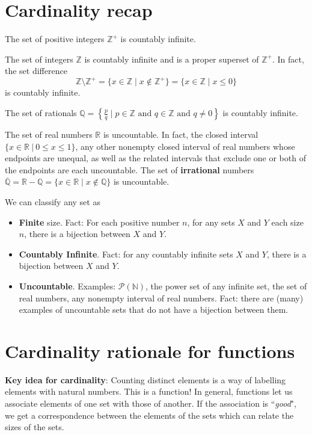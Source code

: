 \documentclass[12pt, oneside]{article}
\begin{document}
\section*{Cardinality recap}



The set of positive integers $\mathbb{Z}^{+}$ is countably infinite.

The set of integers $\mathbb{Z}$ is countably infinite and is a proper superset of $\mathbb{Z}^{+}$. 
In fact, the set difference 
$$\mathbb{Z} \setminus \mathbb{Z}^{+} = \{ x \in \mathbb{Z} \mid x \notin \mathbb{Z}^+\} 
= \{ x \in \mathbb{Z} \mid x \leq 0 \}$$ is countably infinite.

The set of rationals 
$\mathbb{Q} = \left\{ \frac{p}{q} \mid p \in \mathbb{Z}  \text{ and  } 
q  \in \mathbb{Z} \text{ and } q \neq  0 \right\}$ is countably infinite.


The set of real numbers $\mathbb{R}$ is uncountable. In fact, the closed 
interval $\{x \in \mathbb{R} ~|~ 0 \leq x \leq 1\}$, 
any other nonempty closed interval of real numbers whose endpoints are 
unequal, as well as the related intervals that exclude one or both of the endpoints are
each uncountable.
The set of {\bf irrational} numbers $\overline{\mathbb{Q}} = \mathbb{R} - \mathbb{Q}
= \{ x \in \mathbb{R} \mid x \notin \mathbb{Q} \}$ is uncountable.

\vfill

We can classify any set as 
\begin{itemize}
\item {\bf Finite} size. Fact: For each positive number $n$, for any sets $X$ and $Y$ each 
size $n$, there is a bijection between $X$ and $Y$.
\item {\bf Countably Infinite}. Fact: for any countably infinite sets $X$ and $Y$, there is a bijection
between $X$ and $Y$.
\item {\bf Uncountable}. Examples: $\mathcal{P}(\mathbb{N})$, the power set of any infinite set, 
the set of real numbers, any nonempty interval of real numbers. Fact: there are (many) examples 
of uncountable sets that do not have a bijection between them.
\end{itemize} \vfill
\section*{Cardinality rationale for functions}


{\bf Key idea for cardinality}: Counting 
distinct elements is a way of labelling elements
with natural numbers. This is a function!
In general, functions let us 
associate elements of one set with those
of another. If the association is ``{\it good}", 
we get a correspondence between the elements of the sets
which can relate the sizes of the sets. \vfill
\end{document}
